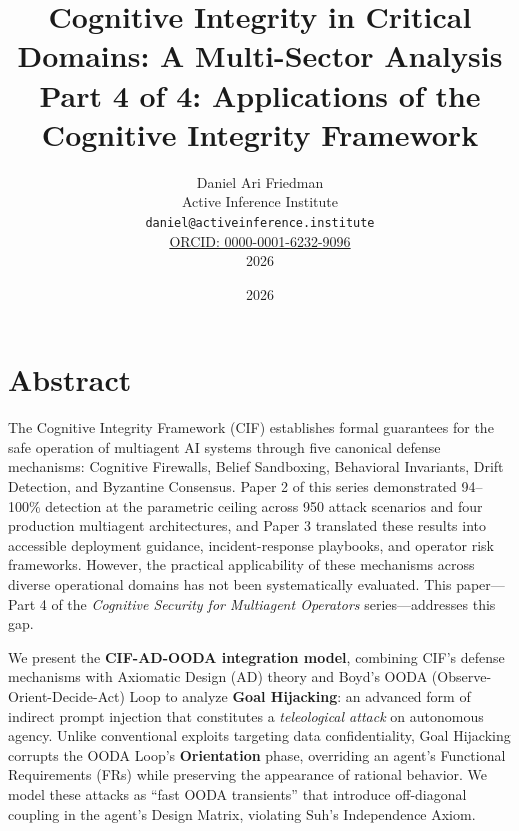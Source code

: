 \documentclass[
]{article}
\author{}
\date{}
\title{Cognitive Integrity in Critical Domains: A Multi-Sector Analysis\\\normalsize Part 4 of 4: Applications of the Cognitive Integrity Framework}
\author{Daniel Ari Friedman\\\footnotesize{Active Inference Institute}\\\footnotesize{\texttt{daniel@activeinference.institute}}\\\footnotesize{\href{https://orcid.org/0000-0001-6232-9096}{ORCID: 0000-0001-6232-9096}} \\ \footnotesize{2026}}
\date{2026}
\begin{document}
\maketitle
\thispagestyle{empty}
\tableofcontents
\newpage


\section{Abstract}\label{abstract}

The Cognitive Integrity Framework (CIF) \cite{friedman2026cogsec1}
establishes formal guarantees for the safe operation of multiagent AI
systems through five canonical defense mechanisms: Cognitive Firewalls,
Belief Sandboxing, Behavioral Invariants, Drift Detection, and Byzantine
Consensus. Paper 2 of this series \cite{friedman2026cogsec2}
demonstrated 94--100\% detection at the parametric ceiling across 950
attack scenarios and four production multiagent architectures, and Paper
3 \cite{friedman2026cogsec3} translated these results into accessible
deployment guidance, incident-response playbooks, and operator risk
frameworks. However, the practical applicability of these mechanisms
across diverse operational domains has not been systematically
evaluated. This paper---Part 4 of the \emph{Cognitive Security for
Multiagent Operators} series---addresses this gap.

We present the \textbf{CIF-AD-OODA integration model}, combining CIF's
defense mechanisms with Axiomatic Design (AD) theory
\cite{suh2001axiomatic} and Boyd's OODA (Observe-Orient-Decide-Act) Loop
\cite{boyd1987patterns} to analyze \textbf{Goal Hijacking}: an advanced
form of indirect prompt injection that constitutes a \emph{teleological
attack} on autonomous agency. Unlike conventional exploits targeting
data confidentiality, Goal Hijacking corrupts the OODA Loop's
\textbf{Orientation} phase, overriding an agent's Functional
Requirements (FRs) while preserving the appearance of rational behavior.
We model these attacks as ``fast OODA transients'' that introduce
off-diagonal coupling in the agent's Design Matrix, violating Suh's
Independence Axiom.
\end{document}

